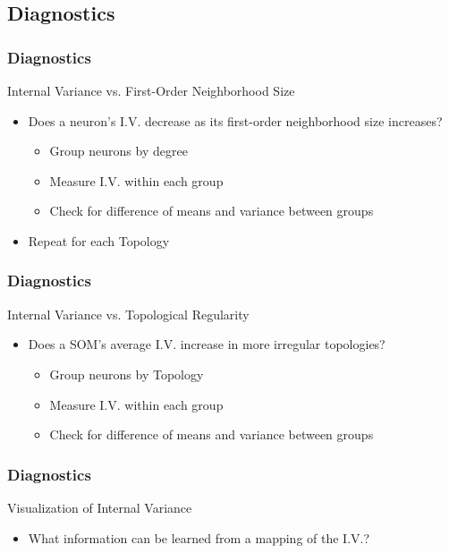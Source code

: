 \documentclass[nototal,handout]{beamer}
\begin{document}
\subsection{Diagnostics} 

\begin{frame}
	\frametitle{Diagnostics}
 
\begin{block}{Internal Variance vs. First-Order Neighborhood Size}
 \begin{itemize}
 \item  Does a neuron's I.V. decrease as its first-order neighborhood size increases?
 \begin{itemize}
 \item  Group neurons by degree
 \item  Measure I.V. within each group
 \item  Check for difference of means and variance between groups
 \end{itemize}
 \item  Repeat for each Topology
 \end{itemize}
 \end{block} \end{frame} 

\begin{frame}
	\frametitle{Diagnostics}
 
\begin{block}{Internal Variance vs. Topological Regularity}
 \begin{itemize}
 \item  Does a SOM's average I.V. increase in more irregular topologies?
 \begin{itemize}
 \item  Group neurons by Topology
 \item  Measure I.V. within each group
 \item  Check for difference of means and variance between groups
 \end{itemize}
 \end{itemize}
 \end{block} \end{frame} 

\begin{frame}
	\frametitle{Diagnostics}
 
\begin{block}{Visualization of Internal Variance}
 \begin{itemize}
 \item  What information can be learned from a mapping of the I.V.?
 \end{itemize}
 \end{block} \end{frame} 
\end{document}
